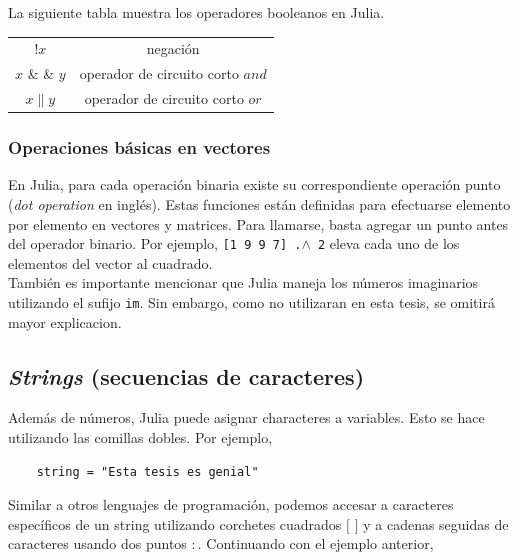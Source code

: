 La siguiente tabla muestra los operadores booleanos en Julia. 

\begin{center}
\begin{tabular}{ |c|c| } 
 \hline
 $!x$ & negación \\ 
 $x$ \& \& $y$ & operador de circuito corto $and$ \\ 
 $x \parallel y$ & operador de circuito corto $or$ \\ 
 \hline
\end{tabular}
\end{center}

\subsubsection{Operaciones básicas en vectores}
En Julia, para cada operación binaria existe su correspondiente operación punto (\textit{dot operation} en inglés). Estas funciones están definidas para efectuarse elemento por elemento en vectores y matrices. Para llamarse, basta agregar un punto antes del operador binario. Por ejemplo,
 \texttt{[1 9 9 7] .$\wedge$ 2} eleva cada uno de los elementos del vector al cuadrado. 
\\
También es importante mencionar que Julia maneja los números imaginarios utilizando el sufijo \texttt{im}. Sin embargo, como no utilizaran en esta tesis, se omitirá mayor explicacion. 


\subsection{\textit{Strings} (secuencias de caracteres)} 

Además de números, Julia puede asignar characteres a variables. Esto se hace utilizando las comillas dobles. Por ejemplo,

\begin{verbatim}
    string = "Esta tesis es genial"
\end{verbatim}


\begin{tcolorbox}
\end{tcolorbox}

Similar a otros lenguajes de programación, podemos accesar a caracteres específicos de un string utilizando corchetes cuadrados $[$ $]$ y a cadenas seguidas de caracteres usando dos puntos $:$. Continuando con el ejemplo anterior, 

